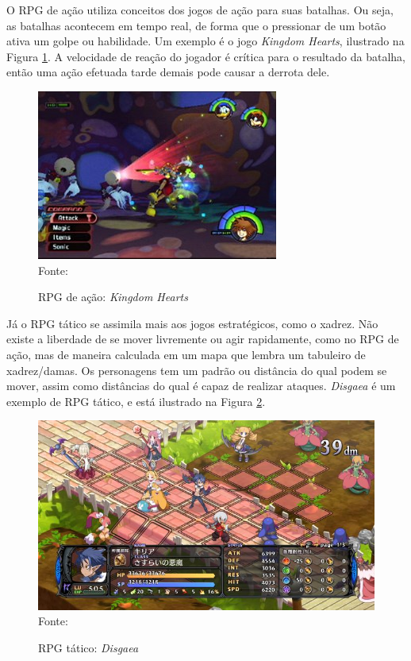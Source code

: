 \documentclass[
	12pt,					%
	openright,				%
	oneside,				%
	a4paper,				%
	bibjustif,				%
	chapter=TITLE,			%
	english,				%
	brazil,					%
	]{abntex2}
\newcommand{\source}[1]{\small Fonte: {#1}}
\begin{document}
		O RPG de ação utiliza conceitos dos jogos de ação para suas batalhas.
		Ou seja, as batalhas acontecem em tempo real,
		de forma que o pressionar de um botão ativa um golpe ou habilidade.
		Um exemplo é o jogo \textit{Kingdom Hearts},
		ilustrado na Figura \ref{fig:kingdomHearts}.
		A velocidade de reação do jogador é crítica para o resultado da batalha,
		então uma ação efetuada tarde demais pode causar a derrota dele.
		
		\begin{figure}[ht!]
			\caption{RPG de ação: \textit{Kingdom Hearts}}
			\centering
			\includegraphics[scale=0.7]{img/kingdom_hearts.jpg}\\
			\vspace{0.5mm}
			\source{}
			\label{fig:kingdomHearts}
		\end{figure}
		
		Já o RPG tático se assimila mais aos jogos estratégicos, como o xadrez.
		Não existe a liberdade de se mover livremente ou agir rapidamente,
		como no RPG de ação,
		mas de maneira calculada em um mapa que lembra um tabuleiro de xadrez/damas.
		Os personagens tem um padrão ou distância do qual podem se mover,
		assim como distâncias do qual é capaz de realizar ataques.
		\textit{Disgaea} é um exemplo de RPG tático,
		e está ilustrado na Figura \ref{fig:disgaea}.
		
		\begin{figure}[ht!]
			\caption{RPG tático: \textit{Disgaea}}
			\centering
			\includegraphics[scale=0.60]{img/disgaea.jpg}\\
			\vspace{0.5mm}
			\source{}
			\label{fig:disgaea}
		\end{figure}
		
\end{document}
